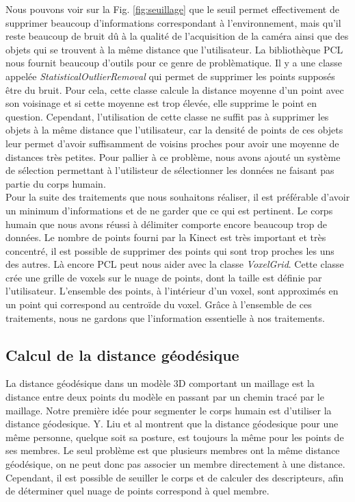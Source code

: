 Nous pouvons voir sur la Fig. \ref{fig:seuillage} que le seuil permet effectivement de supprimer beaucoup d'informations
correspondant à l'environnement, mais qu'il reste beaucoup de bruit dû à la qualité de l'acquisition de la caméra ainsi que 
des objets qui se trouvent à la même distance que l'utilisateur. La bibliothèque
PCL\cite{PCL} nous fournit beaucoup d'outils pour ce genre de problèmatique. Il y a une classe appelée \textit{StatisticalOutlierRemoval}
qui permet de supprimer les points supposés être du bruit. Pour cela, cette classe calcule la distance moyenne d'un point avec son
voisinage et si cette moyenne est trop élevée, elle supprime le point en question. Cependant, l'utilisation de cette classe ne
suffit pas à supprimer les objets à la même distance que l'utilisateur, car la densité de points de ces objets leur permet d'avoir
suffisamment de voisins proches pour avoir une moyenne de distances très petites. Pour pallier à ce problème, nous avons ajouté un
système de sélection permettant à l'utilisteur de sélectionner les données ne faisant pas partie du corps humain.\\

Pour la suite des traitements que nous souhaitons réaliser, il est préférable d'avoir un minimum d'informations et de ne garder
que ce qui est pertinent. Le corps humain que nous avons réussi à délimiter comporte encore beaucoup trop de données. Le nombre
de points fourni par la Kinect est très important et très concentré, il est possible de supprimer des points qui sont trop 
proches les uns des autres. Là encore PCL\cite{PCL} peut nous aider avec la classe \textit{VoxelGrid}. Cette classe crée une grille de
voxels sur le nuage de points, dont la taille est définie par l'utilisateur. L'ensemble des points, à l'intérieur d'un voxel, sont 
approximés en un point qui correspond au centroïde du voxel. Grâce à l'ensemble de ces traitements, nous ne gardons que l'information 
essentielle à nos traitements.

\subsection{Calcul de la distance géodésique}
La distance géodésique dans un modèle 3D comportant un maillage est la distance entre deux points du modèle en passant par un chemin
tracé par le maillage.
Notre première idée pour segmenter le corps humain est d'utiliser la distance géodesique. Y. Liu et al\cite{GIF} montrent que la distance
géodesique pour une même personne, quelque soit sa posture, est toujours la même pour les points de ses membres. Le seul problème 
est que plusieurs membres ont la même distance géodésique, on ne peut donc pas associer un membre directement à une distance.
Cependant, il est possible de seuiller le corps et de calculer des descripteurs, afin de déterminer quel nuage de points
correspond à quel membre.\\

